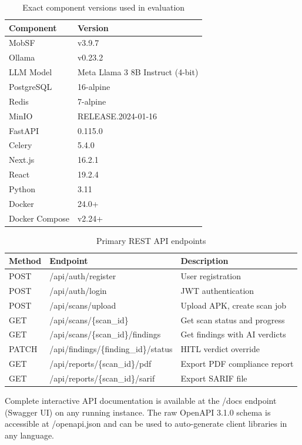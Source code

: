 \documentclass[preprint,12pt,a4paper]{elsarticle}
\begin{document}
\begin{table}[h]
\caption{Exact component versions used in evaluation}
\begin{tabular}{ll}
Component & Version \\
\hline
MobSF & v3.9.7 \\
Ollama & v0.23.2 \\
LLM Model & Meta Llama 3 8B Instruct (4-bit) \\
PostgreSQL & 16-alpine \\
Redis & 7-alpine \\
MinIO & RELEASE.2024-01-16 \\
FastAPI & 0.115.0 \\
Celery & 5.4.0 \\
Next.js & 16.2.1 \\
React & 19.2.4 \\
Python & 3.11 \\
Docker & 24.0+ \\
Docker Compose & v2.24+ \\
\end{tabular}
\end{table}

\begin{table}[h]
\caption{Primary REST API endpoints}
\begin{tabular}{lll}
Method & Endpoint & Description \\
\hline
POST & /api/auth/register & User registration \\
POST & /api/auth/login & JWT authentication \\
POST & /api/scans/upload & Upload APK, create scan job \\
GET & /api/scans/\{scan\_id\} & Get scan status and progress \\
GET & /api/scans/\{scan\_id\}/findings & Get findings with AI verdicts \\
PATCH & /api/findings/\{finding\_id\}/status & HITL verdict override \\
GET & /api/reports/\{scan\_id\}/pdf & Export PDF compliance report \\
GET & /api/reports/\{scan\_id\}/sarif & Export SARIF file \\
\end{tabular}
\end{table}

Complete interactive API documentation is available at the /docs endpoint (Swagger UI) on any running instance. The raw OpenAPI 3.1.0 schema is accessible at /openapi.json and can be used to auto-generate client libraries in any language.
\end{document}
